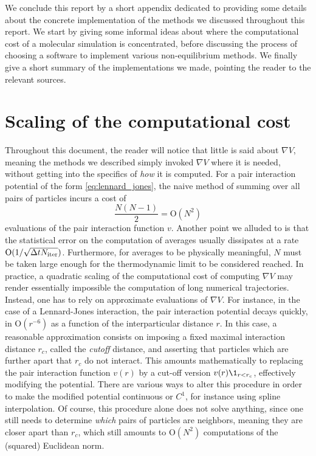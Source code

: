 We conclude this report by a short appendix dedicated to providing some details about the concrete implementation of the methods we discussed throughout this report.
We start by giving some informal ideas about where the computational cost of a molecular simulation is concentrated, before discussing the process of choosing a software to implement various non-equilibrium methods.
We finally give a short summary of the implementations we made, pointing the reader to the relevant sources.

\section{Scaling of the computational cost}
Throughout this document, the reader will notice that little is said about $\nabla V$, meaning the methods we described simply invoked $\nabla V$ where it is needed, 
without getting into the specifics of \textit{how} it is computed.
For a pair interaction potential of the form \eqref{eq:lennard_jones}, the naive method of summing over all pairs of particles incurs a cost of
\[\frac{N(N-1)}2 =\mathrm{O}(N^2)\]
evaluations of the pair interaction function $v$.
Another point we alluded to is that the statistical error on the computation of averages usually dissipates at a rate $\mathrm{O}(1/\sqrt{{\Delta t} N_{\mathrm{iter}}})$.
Furthermore, for averages to be physically meaningful, $N$ must be taken large enough for the thermodynamic limit to be considered reached.
In practice, a quadratic scaling of the computational cost of computing $\nabla V$ may render essentially impossible the computation of long numerical trajectories.
Instead, one has to rely on approximate evaluations of $\nabla V$. For instance, in the case of a Lennard-Jones interaction, the pair interaction potential decays quickly, in $\mathrm{O}(r^{-6})$ as a function of the interparticular distance $r$.
In this case, a reasonable approximation consists on imposing a fixed maximal interaction distance $r_c$, called the \textit{cutoff} distance, and asserting that particles which are further apart that $r_c$ do not interact.
This amounts mathematically to replacing the pair interaction function $v(r)$ by a cut-off version $v(r)\1_{r<r_c}$, effectively modifying the potential.
There are various ways to alter this procedure in order to make the modified potential continuous or $C^1$, for instance using spline interpolation. 
Of course, this procedure alone does not solve anything, since one still needs to determine \textit{which} pairs of particles are neighbors, meaning they are closer apart than $r_c$, which still amounts to $\mathrm{O}(N^2)$ computations of the (squared) Euclidean norm.
